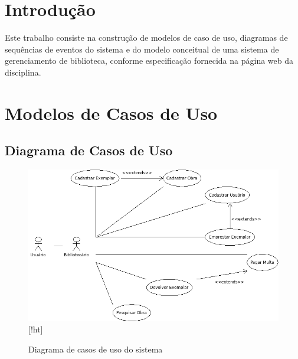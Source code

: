 \documentclass[
	12pt,				%
	openright,			%
	oneside,			%
	a4paper,			%
	english,			%
	brazil				%
	]{abntex2}
\begin{document}
\frenchspacing 


\imprimircapa

\imprimirfolhaderosto*

\tableofcontents*
\cleardoublepage



\textual

\chapter*[Introdução]{Introdução}

	Este trabalho consiste na construção de modelos de caso de uso, diagramas de sequências de eventos do sistema e do modelo conceitual 
de uma sistema de gerenciamento de biblioteca, conforme especificação fornecida na página web da disciplina.

\chapter{Modelos de Casos de Uso}

\section{Diagrama de Casos de Uso}

\begin{figure}
\includegraphics[width=1\textwidth]{useCase}[!ht]
\label{fig:figura1}
\caption{\small Diagrama de casos de uso do sistema}
\end{figure}
\end{document}

